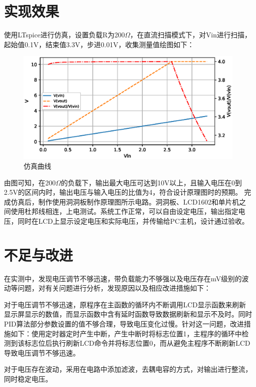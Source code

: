 \documentclass[a4paper]{article}
\newcommand{\sectionbreak}{\clearpage} %
\theoremstyle{definition}
\theoremstyle{plain}
\theoremstyle{remark}
\begin{document}
\section{实现效果}
使用LTspice进行仿真，设置负载R为200$\Omega$，在直流扫描模式下，对Vin进行扫描，起始值0.1V，结束值3.3V，步进0.01V，收集测量值绘图如下：
\begin{figure}[H]
	\centering
	\includegraphics[width=1\textwidth]{仿真曲线}
	\caption{仿真曲线}
\end{figure}
由图可知，在200$\Omega$的负载下，输出最大电压可达到10V以上，且输入电压在0到2.5V的区间内时，输出电压与输入电压的比值为4，符合设计原理图时的预期。
完成仿真后，制作使用洞洞板制作原理图所示电路。洞洞板、LCD1602和单片机之间使用杜邦线相连，上电测试。系统工作正常，可以自由设定电压，输出指定电压，同时在LCD上显示设定电压和实际电压，并传输给PC主机，设计通过验收。
\sectionbreak

\section{不足与改进}
在实测中，发现电压调节不够迅速，带负载能力不够强以及电压存在mV级别的波动等问题，对有关问题进行分析，发现原因以及相应改进措施如下：

对于电压调节不够迅速，原程序在主函数的循环内不断调用LCD显示函数来刷新显示屏显示的数值，而显示函数中含有延时函数导致数据刷新和显示不及时。同时PID算法部分参数设置的值不够合理，导致电压变化过慢。针对这一问题，改进措施如下：使用定时器定时产生中断，产生中断时将标志位置1，主程序的循环中检测到该标志位后执行刷新LCD命令并将标志位置0，而从避免主程序不断刷新LCD导致电压调节不够迅速。

对于电压存在波动，采用在电路中添加滤波，去耦电容的方式，对输出进行整流，同时稳定电压。
\end{document}
